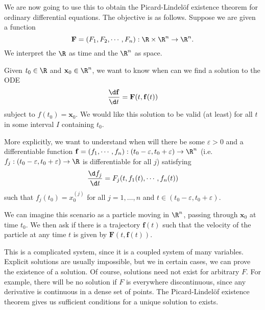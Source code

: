 \documentclass[a4paper]{article}
\begin{document}
We are now going to use this to obtain the Picard-Lindel\"of existence theorem for ordinary differential equations. The objective is as follows. Suppose we are given a function
\[
  \mathbf{F} = (F_1, F_2, \cdots, F_n): \R\times \R^n \to \R^n.
\]
We interpret the $\R$ as time and the $\R^n$ as space.

Given $t_0 \in \R$ and $\mathbf{x}_0 \in \R^n$, we want to know when can we find a solution to the ODE
\[
  \frac{\d \mathbf{f}}{\d t} = \mathbf{F}(t, \mathbf{f}(t))
\]
subject to $f(t_0) = \mathbf{x}_0$. We would like this solution to be valid (at least) for all $t$ in some interval $I$ containing $t_0$.

More explicitly, we want to understand when will there be some $\varepsilon > 0$ and a differentiable function $\mathbf{f} = (f_1, \cdots, f_n): (t_0 - \varepsilon, t_0 + \varepsilon) \to \R^n$ (i.e.\ $f_j: (t_0 - \varepsilon, t_0 + \varepsilon) \to \R$ is differentiable for all $j$) satisfying
\[
  \frac{\d f_j}{\d t} = F_j(t, f_1(t), \cdots, f_n(t))
\]
such that $f_j(t_0) = x_0^{(j)}$ for all $j = 1, \ldots, n$ and $t \in (t_0 - \varepsilon, t_0 + \varepsilon)$.

We can imagine this scenario as a particle moving in $\R^n$, passing through $\mathbf{x}_0$ at time $t_0$. We then ask if there is a trajectory $\mathbf{f}(t)$ such that the velocity of the particle at any time $t$ is given by $\mathbf{F}(t, \mathbf{f}(t))$.

This is a complicated system, since it is a coupled system of many variables. Explicit solutions are usually impossible, but we in certain cases, we can prove the existence of a solution. Of course, solutions need not exist for arbitrary $F$. For example, there will be no solution if $F$ is everywhere discontinuous, since any derivative is continuous in a dense set of points. The Picard-Lindel\"of existence theorem gives us sufficient conditions for a unique solution to exists.
\end{document}
